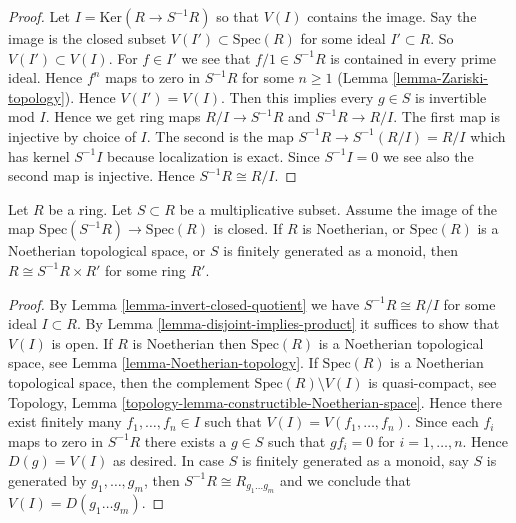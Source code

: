 \begin{proof}
Let $I = \text{Ker}(R \to S^{-1}R)$ so that $V(I)$ contains the image.
Say the image is the closed subset $V(I') \subset \text{Spec}(R)$ for
some ideal $I' \subset R$. So $V(I') \subset V(I)$.
For $f \in I'$ we see that $f/1 \in S^{-1}R$
is contained in every prime ideal. Hence $f^n$ maps to zero in $S^{-1}R$
for some $n \geq 1$ (Lemma \ref{lemma-Zariski-topology}).
Hence $V(I') = V(I)$.
Then this implies every $g \in S$ is invertible mod $I$.
Hence we get ring maps $R/I \to S^{-1}R$ and $S^{-1}R \to R/I$.
The first map is injective by choice of $I$.
The second is the map $S^{-1}R \to S^{-1}(R/I) = R/I$ which
has kernel $S^{-1}I$ because localization is exact.
Since $S^{-1}I = 0$ we see also the second map is injective.
Hence $S^{-1}R \cong R/I$.
\end{proof}

\begin{lemma}
\label{lemma-invert-closed-split}
Let $R$ be a ring. Let $S \subset R$ be a multiplicative subset.
Assume the image of the map $\text{Spec}(S^{-1}R) \to \text{Spec}(R)$
is closed. If $R$ is Noetherian, or $\text{Spec}(R)$ is a
Noetherian topological space, or $S$ is finitely generated as a monoid,
then $R \cong S^{-1}R \times R'$ for some ring $R'$.
\end{lemma}

\begin{proof}
By Lemma \ref{lemma-invert-closed-quotient} we have $S^{-1}R \cong R/I$
for some ideal $I \subset R$. By Lemma \ref{lemma-disjoint-implies-product}
it suffices to show that $V(I)$ is open.
If $R$ is Noetherian then $\text{Spec}(R)$ is a Noetherian
topological space, see Lemma \ref{lemma-Noetherian-topology}.
If $\text{Spec}(R)$ is a Noetherian topological space,
then the complement $\text{Spec}(R) \setminus V(I)$ is quasi-compact,
see Topology, Lemma \ref{topology-lemma-constructible-Noetherian-space}.
Hence there exist finitely many $f_1, \ldots, f_n \in I$ such
that $V(I) = V(f_1, \ldots, f_n)$.
Since each $f_i$ maps to zero in $S^{-1}R$
there exists a $g \in S$ such that $gf_i = 0$ for
$i = 1, \ldots, n$. Hence $D(g) = V(I)$ as desired.
In case $S$ is finitely generated as a monoid, say $S$ is generated
by $g_1, \ldots, g_m$, then $S^{-1}R \cong R_{g_1 \ldots g_m}$
and we conclude that $V(I) = D(g_1 \ldots g_m)$.
\end{proof}














